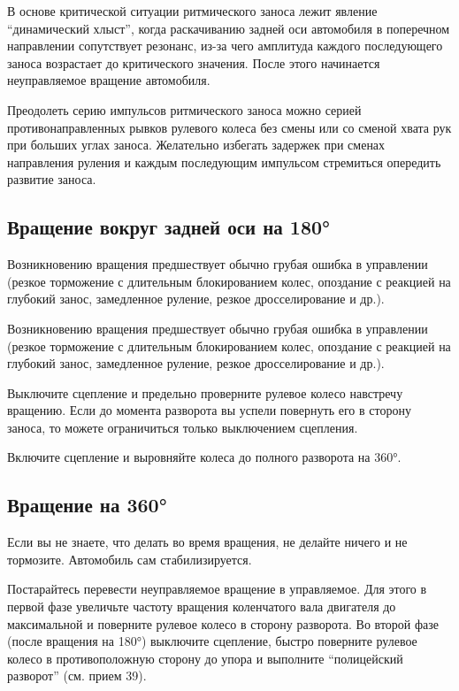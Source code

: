В основе критической ситуации ритмического заноса лежит явление “динамический хлыст”, когда раскачиванию задней оси автомобиля в поперечном направлении сопутствует резонанс, из-за чего амплитуда каждого последующего заноса возрастает до критического значения. После этого начинается неуправляемое вращение автомобиля.

Преодолеть серию импульсов ритмического заноса можно серией противонаправленных рывков рулевого колеса без смены или со сменой хвата рук при больших углах заноса. Желательно избегать задержек при сменах направления руления и каждым последующим импульсом стремиться опередить развитие заноса.

\subsection{Вращение вокруг задней оси на 180°}

Возникновению вращения предшествует обычно грубая ошибка в управлении (резкое торможение с длительным блокированием колес, опоздание с реакцией на глубокий занос, замедленное руление, резкое дросселирование и др.).

Возникновению вращения предшествует обычно грубая ошибка в управлении (резкое торможение с длительным блокированием колес, опоздание с реакцией на глубокий занос, замедленное руление, резкое дросселирование и др.).

Выключите сцепление и предельно проверните рулевое колесо навстречу вращению. Если до момента разворота вы успели повернуть его в сторону заноса, то можете ограничиться только выключением сцепления.

Включите сцепление и выровняйте колеса до полного разворота на 360°.

\subsection{Вращение на 360°}

Если вы не знаете, что делать во время вращения, не делайте ничего и не тормозите. Автомобиль сам стабилизируется.

Постарайтесь перевести неуправляемое вращение в управляемое. Для этого в первой фазе увеличьте частоту вращения коленчатого вала двигателя до максимальной и поверните рулевое колесо в сторону разворота. Во второй фазе (после вращения на 180°) выключите сцепление, быстро поверните рулевое колесо в противоположную сторону до упора и выполните “полицейский разворот” (см. прием 39).

